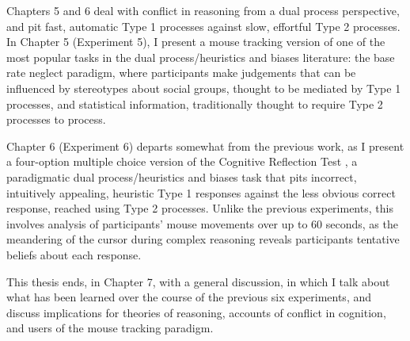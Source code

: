 Chapters 5 and 6 deal with conflict in reasoning from a dual process perspective,
and pit fast, automatic Type 1 processes
against slow, effortful Type 2 processes.
In Chapter 5 (Experiment 5), I present a mouse tracking version of
one of the most popular tasks in the dual process/heuristics and biases literature:
the base rate neglect paradigm,
where participants make judgements that can be influenced by
stereotypes about social groups, thought to be mediated by Type 1 processes,
and statistical information, traditionally thought to
require Type 2 processes to process.


Chapter 6 (Experiment 6) departs somewhat from the previous work,
as I present a four-option multiple choice version
of the Cognitive Reflection Test \citep{Frederick2005},
a paradigmatic dual process/heuristics and biases task
that pits incorrect, intuitively appealing, heuristic Type 1 responses
against the less obvious correct response, reached using Type 2 processes.
Unlike the previous experiments, this involves analysis of
participants' mouse movements over up to 60 seconds,
as the meandering of the cursor during complex reasoning
reveals participants tentative beliefs about each response.

This thesis ends, in Chapter 7, with a general discussion,
in which I talk about what has been learned over
the course of the previous six experiments,
and discuss implications for
theories of reasoning,
accounts of conflict in cognition,
and users of the mouse tracking paradigm.

